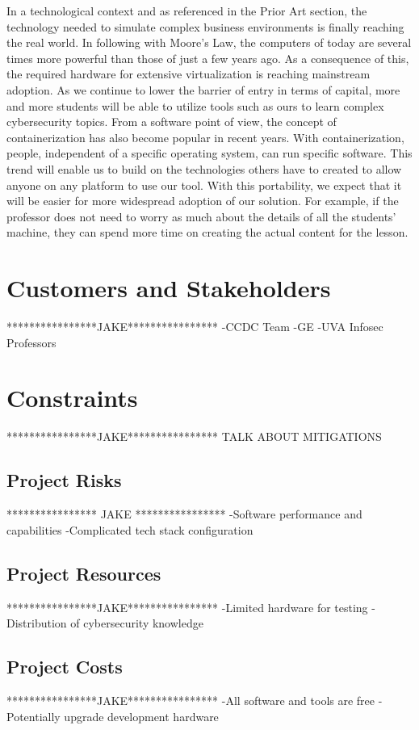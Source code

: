 \documentclass[openright]{report}
\begin{document}
\par In a technological context and as referenced in the Prior Art section, the technology needed to simulate complex business environments is finally reaching the real world. In following with Moore's Law, the computers of today are several times more powerful than those of just a few years ago. As a consequence of this, the required hardware for extensive virtualization is reaching mainstream adoption. As we continue to lower the barrier of entry in terms of capital, more and more students will be able to utilize tools such as ours to learn complex cybersecurity topics. From a software point of view, the concept of containerization has also become popular in recent years. With containerization, people, independent of a specific operating system, can run specific software. This trend will enable us to build on the technologies others have to created to allow anyone on any platform to use our tool. With this portability, we expect that it will be easier for more widespread adoption of our solution. For example, if the professor does not need to worry as much about the details of all the students' machine, they can spend more time on creating the actual content for the lesson.

\section{Customers and Stakeholders}
****************JAKE****************
-CCDC Team
-GE
-UVA Infosec Professors

\section{Constraints}
****************JAKE****************
TALK ABOUT MITIGATIONS

\subsection{Project Risks}
**************** JAKE ****************
-Software performance and capabilities
-Complicated tech stack configuration

\subsection{Project Resources}
****************JAKE****************
-Limited hardware for testing
-Distribution of cybersecurity knowledge

\subsection{Project Costs}
****************JAKE****************
-All software and tools are free
-Potentially upgrade development hardware
\end{document}
